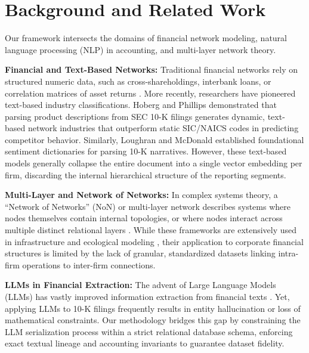 \section{Background and Related Work}
\label{sec:background}

Our framework intersects the domains of financial network modeling, natural language processing (NLP) in accounting, and multi-layer network theory.

\textbf{Financial and Text-Based Networks:} Traditional financial networks rely on structured numeric data, such as cross-shareholdings, interbank loans, or correlation matrices of asset returns \cite{mantegna1999, battiston2012, vitali2011}. More recently, researchers have pioneered text-based industry classifications. Hoberg and Phillips \cite{hoberg2016} demonstrated that parsing product descriptions from SEC 10-K filings generates dynamic, text-based network industries that outperform static SIC/NAICS codes in predicting competitor behavior. Similarly, Loughran and McDonald \cite{loughran2011} established foundational sentiment dictionaries for parsing 10-K narratives. However, these text-based models generally collapse the entire document into a single vector embedding per firm, discarding the internal hierarchical structure of the reporting segments.

\textbf{Multi-Layer and Network of Networks:} In complex systems theory, a ``Network of Networks'' (NoN) or multi-layer network describes systems where nodes themselves contain internal topologies, or where nodes interact across multiple distinct relational layers \cite{gao2012, kivela2014, boccaletti2014}. While these frameworks are extensively used in infrastructure and ecological modeling \cite{bargigli2015}, their application to corporate financial structures is limited by the lack of granular, standardized datasets linking intra-firm operations to inter-firm connections.

\textbf{LLMs in Financial Extraction:} The advent of Large Language Models (LLMs) has vastly improved information extraction from financial texts \cite{wu2023}. Yet, applying LLMs to 10-K filings frequently results in entity hallucination or loss of mathematical constraints. Our methodology bridges this gap by constraining the LLM serialization process within a strict relational database schema, enforcing exact textual lineage and accounting invariants to guarantee dataset fidelity.